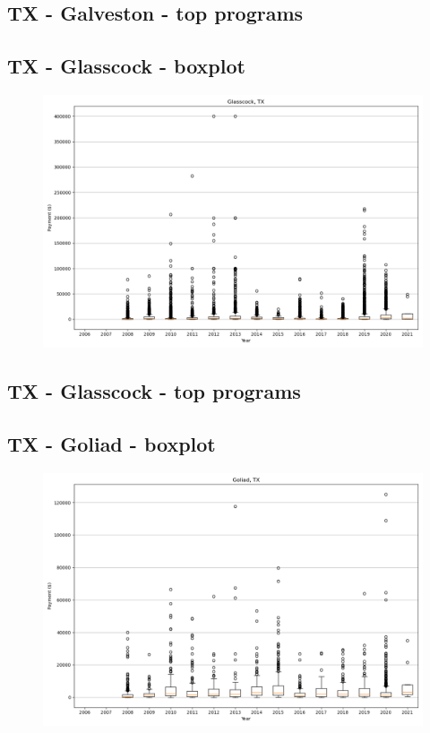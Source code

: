 \subsection*{TX - Galveston - top programs}

\newpage
\subsection*{TX - Glasscock - boxplot}
\begin{figure}[h]
\centering
\includegraphics[width=7in]{../output/boxplots/counties/Glasscock-TX_boxplot.png}
\end{figure}


\subsection*{TX - Glasscock - top programs}

\newpage
\subsection*{TX - Goliad - boxplot}
\begin{figure}[h]
\centering
\includegraphics[width=7in]{../output/boxplots/counties/Goliad-TX_boxplot.png}
\end{figure}



